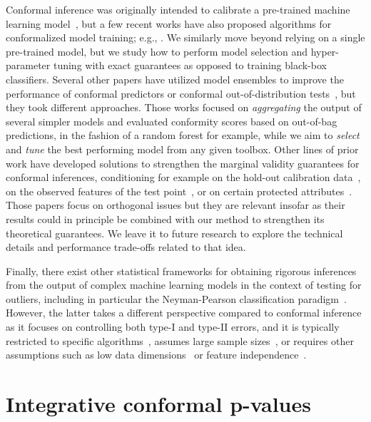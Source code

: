 \documentclass[11pt]{article}
\begin{document}
Conformal inference was originally intended to calibrate a pre-trained machine learning model~\cite{vovk2005algorithmic}, but a few recent works have also proposed algorithms for conformalized model training; e.g., \cite{colombo2020training,einbinder2022training}. We similarly move beyond relying on a single pre-trained model, but we study how to perform model selection and hyper-parameter tuning with exact guarantees as opposed to training black-box classifiers.
Several other papers have utilized model ensembles to improve the performance of conformal predictors \cite{lofstrom2013effective,beganovic2018ensemble,linusson2020efficient,kim2020predictive,gupta2022nested,fannjiang2022conformal} or conformal out-of-distribution tests~\cite{xu2021conformal}, but they took different approaches. Those works focused on {\it aggregating} the output of several simpler models and evaluated conformity scores based on out-of-bag predictions, in the fashion of a random forest for example, while we aim to {\em select} and {\em tune} the best performing model from any given toolbox.
Other lines of prior work have developed solutions to strengthen the marginal validity guarantees for conformal inferences, conditioning for example on the hold-out calibration data~\cite{vovk2012conditional,bates2021testing}, on the observed features of the test point~\cite{barber2019limits}, or on certain protected attributes~\cite{romano2019malice}. Those papers focus on orthogonal issues but they are relevant insofar as their results could in principle be combined with our method to strengthen its theoretical guarantees. We leave it to future research to explore the technical details and performance trade-offs related to that idea.

Finally, there exist other statistical frameworks for obtaining rigorous inferences from the output of complex machine learning models in the context of testing for outliers, including in particular the Neyman-Pearson classification paradigm~\cite{rigollet2011neyman,tong2018neyman,tong2013plug,zhao2016neyman}.
However, the latter takes a different perspective compared to conformal inference as it focuses on controlling both type-I and type-II errors, and it is typically restricted to specific algorithms~\cite{rigollet2011neyman}, assumes large sample sizes~\cite{tong2018neyman}, or requires other assumptions such as low data dimensions~\cite{tong2013plug} or feature independence~\cite{zhao2016neyman}.


\section{Integrative conformal p-values} \label{sec:weighted}
\end{document}
